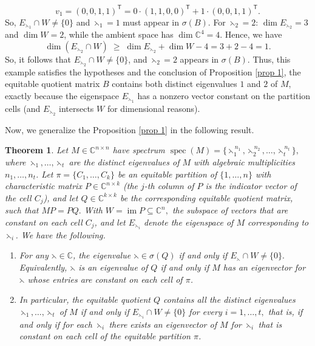 \documentclass[12pt,twoside]{article}
\newtheorem{theorem}{Theorem}[section]
\begin{document}
		$$
		v_1=(0,0,1,1)^{\mathsf T} = 0\cdot(1,1,0,0)^{\mathsf T} + 1\cdot(0,0,1,1)^{\mathsf T}.
		$$
		So, $E_{\leftthreetimes_1}\cap W\neq\{0\}$ and $\leftthreetimes_1=1$ must appear in $\sigma(B)$. For $\leftthreetimes_2=2$: $\dim E_{\leftthreetimes_2}=3$ and $\dim W=2$, while the ambient space has
		$\dim\mathbb{C}^4=4$. Hence, we have
		$$
		\dim(E_{\leftthreetimes_2}\cap W)
		\;\ge\;
		\dim E_{\leftthreetimes_2}+\dim W - 4
		=
		3+2-4=1.
		$$
		So, it follows that $E_{\leftthreetimes_2}\cap W\neq\{0\}$, and $\leftthreetimes_2=2$ appears in $\sigma(B)$. Thus, this example satisfies the hypotheses and the conclusion of Proposition \ref{prop 1}, the equitable quotient matrix $B$ contains
	both distinct eigenvalues $1$ and $2$ of $M$, exactly because the eigenspace $E_{\leftthreetimes_1}$ has a
	nonzero vector constant on the partition cells (and $E_{\leftthreetimes_2}$ intersects $W$ for dimensional
	reasons).


Now, we generalize the Proposition \ref{prop 1} in the following result.
\begin{theorem}\label{thm:equitable-all-eigs-general}
	Let $M\in\mathbb{C}^{n\times n}$ have spectrum $\operatorname{spec}(M) = 	\{\leftthreetimes_1^{\,n_1},\leftthreetimes_2^{\,n_2},\dots,\leftthreetimes_t^{\,n_t}\},$
	 where $\leftthreetimes_1,\dots,\leftthreetimes_t$ are the distinct eigenvalues of $M$ with
	algebraic multiplicities $n_1,\dots,n_t$. Let $	\pi=\{C_1,\dots,C_k\}$ be an equitable partition of $\{1,\dots,n\}$ with characteristic matrix
	$P\in\mathbb{C}^{n\times k}$ (the $j$-th column of $P$ is the indicator vector
	of the cell $C_j$), and let $Q\in\mathbb{C}^{k\times k}$ be the corresponding
	equitable quotient matrix, such that  $MP = P Q.$  With $W  = \operatorname{im}P \subseteq \mathbb{C}^n,$	the subspace of vectors that are constant on each cell $C_j$, and let
	$E_{\leftthreetimes_i}$ denote the eigenspace of $M$ corresponding to $\leftthreetimes_i$. We have the following.
	
	\begin{enumerate}[nosep]
		\item For any $\leftthreetimes\in\mathbb{C}$, the eigenvalue $\leftthreetimes\in\sigma(Q)$ if and only if 
		$E_\leftthreetimes\cap W\neq\{0\}.$ 		Equivalently, $\leftthreetimes$ is an eigenvalue of $Q$ if and only if $M$ has an
		eigenvector for $\leftthreetimes$ whose entries are constant on each cell of $\pi$.
		\item In particular, the equitable quotient $Q$ contains  all the
		distinct eigenvalues $\leftthreetimes_1,\dots,\leftthreetimes_t$ of $M$ if and only if $E_{\leftthreetimes_i}\cap W\neq\{0\}$
		 for every $i=1,\dots,t,$ that is, if and only if for each $\leftthreetimes_i$ there exists an eigenvector of $M$
		for $\leftthreetimes_i$ that is constant on each cell of the equitable partition $\pi$.
	\end{enumerate}
\end{theorem}
\end{document}
